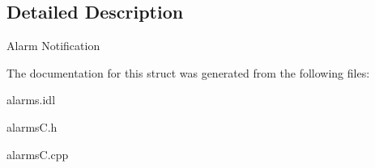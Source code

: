 \subsection{Detailed Description}
Alarm Notification 

The documentation for this struct was generated from the following files\+:\begin{DoxyCompactItemize}
\item 
alarms.\+idl\item 
alarms\+C.\+h\item 
alarms\+C.\+cpp\end{DoxyCompactItemize}
